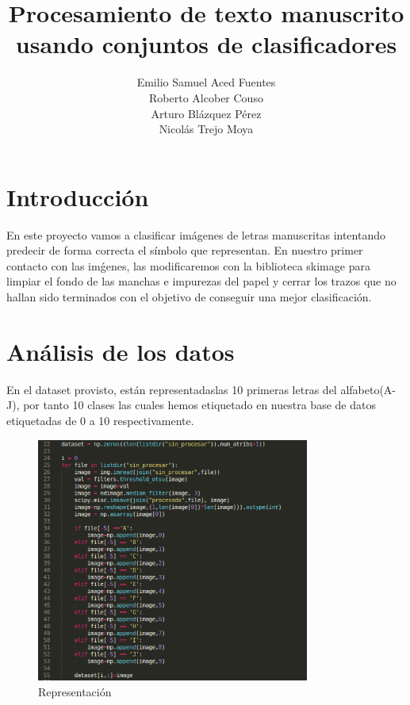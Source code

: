 \documentclass[8pt,a4paper]{article}
\begin{document}
\title{Procesamiento de texto manuscrito usando conjuntos de clasificadores}

\author{
Emilio Samuel Aced Fuentes \\
Roberto Alcober Couso \\
Arturo Bl\'azquez P\'erez \\
Nicol\'as Trejo Moya \\
}

\maketitle

\section{Introducci\'on}
En este proyecto vamos a clasificar im\'agenes de letras manuscritas intentando predecir de forma correcta el s\'imbolo que representan.
En nuestro primer contacto con las im\'genes, las modificaremos con la biblioteca skimage para limpiar el fondo de las manchas e impurezas del papel y cerrar los trazos que no hallan sido terminados con el objetivo de conseguir una mejor clasificaci\'on.



\section{An\'alisis de los datos}
En el dataset provisto, est\'an representadaslas 10 primeras letras del alfabeto(A-J), por tanto 10 clases las cuales hemos etiquetado en nuestra base de datos etiquetadas de 0 a 10 respectivamente.

\begin{figure}[htbp]
\centering
    \includegraphics[width=0.8\textwidth,natwidth=906,natheight=600]{./representacion.png}
    \caption{Representaci\'on}
\end{figure}
\end{document}
